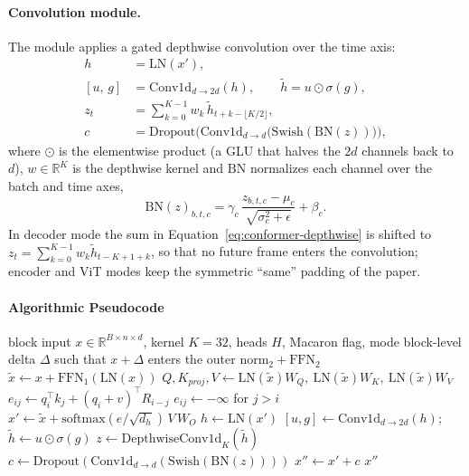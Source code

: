\paragraph{Convolution module.} The module applies a gated depthwise convolution over the time axis:
\begin{align}
h &= \mathrm{LN}(x'), \\
[u,\, g] &= \mathrm{Conv1d}_{d \to 2d}(h), \qquad
\tilde{h} = u \odot \sigma(g), \label{eq:conformer-glu}\\
z_t &= \sum_{k=0}^{K-1} w_k\, \tilde{h}_{t + k - \lfloor K/2 \rfloor}, \label{eq:conformer-depthwise}\\
c &= \mathrm{Dropout}\Big(\mathrm{Conv1d}_{d \to d}\big(\mathrm{Swish}(\mathrm{BN}(z))\big)\Big), \label{eq:conformer-conv-out}
\end{align}
where $\odot$ is the elementwise product (a GLU that halves the $2d$ channels back to $d$), $w \in \mathbb{R}^{K}$ is the depthwise kernel and $\mathrm{BN}$ normalizes each channel over the batch and time axes,
\begin{equation}
\mathrm{BN}(z)_{b,t,c} = \gamma_c\,\frac{z_{b,t,c} - \mu_c}{\sqrt{\sigma_c^2 + \epsilon}} + \beta_c .
\label{eq:conformer-bn}
\end{equation}
In decoder mode the sum in Equation~\ref{eq:conformer-depthwise} is shifted to $z_t = \sum_{k=0}^{K-1} w_k \tilde{h}_{t-K+1+k}$, so that no future frame enters the convolution; encoder and ViT modes keep the symmetric ``same'' padding of the paper.

\paragraph{Algorithmic Pseudocode}

\begin{algorithm}[H]
\caption{Conformer block (\texttt{conformer})}
\begin{algorithmic}[1]
\Require block input $x \in \mathbb{R}^{B \times n \times d}$, kernel $K=32$, heads $H$, Macaron flag, mode
\Ensure block-level delta $\Delta$ such that $x + \Delta$ enters the outer $\mathrm{norm}_2 + \mathrm{FFN}_2$
\State $\tilde{x} \gets x + \mathrm{FFN}_1(\mathrm{LN}(x))$ 
\State $Q, K_{proj}, V \gets \mathrm{LN}(\tilde{x})W_Q,\ \mathrm{LN}(\tilde{x})W_K,\ \mathrm{LN}(\tilde{x})W_V$
\State $e_{ij} \gets q_i^{\top}k_j + (q_i + v)^{\top}R_{i-j}$ 
    \State $e_{ij} \gets -\infty$ for $j > i$ 
\EndIf
\State $x' \gets \tilde{x} + \mathrm{softmax}(e/\sqrt{d_h})\,V\,W_O$
\State $h \gets \mathrm{LN}(x')$
\State $[u, g] \gets \mathrm{Conv1d}_{d \to 2d}(h)$; \quad $\tilde{h} \gets u \odot \sigma(g)$ 
\State $z \gets \mathrm{DepthwiseConv1d}_{K}(\tilde{h})$ 
\State $c \gets \mathrm{Dropout}(\mathrm{Conv1d}_{d \to d}(\mathrm{Swish}(\mathrm{BN}(z))))$
\State $x'' \gets x' + c$
\State \Return $x''$ 
\end{algorithmic}
\end{algorithm}

